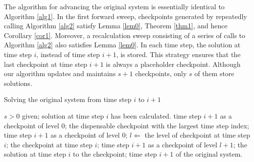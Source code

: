 \documentclass[oneeqnum, onethmnum, onefignum, onetabnum]{siamltex}
\begin{document}
The algorithm for advancing the original system is essentially identical to
Algorithm \ref{alg1}.  In the first forward sweep, checkpoints generated by
repeatedly calling Algorithm \ref{alg2} satisfy Lemma \ref{lem0},
Theorem \ref{thm1}, and hence Corollary \ref{cor1}.  Moreover, a recalculation
sweep consisting of a series of calls to Algorithm \ref{alg2} also satisfies
Lemma \ref{lem0}.  In each time step, the solution at time step $i$, instead
of time step $i + 1$, is stored.  This strategy ensures that the last
checkpoint at time step $i + 1$ is always a placeholder checkpoint.  Although
our algorithm updates and maintains $s + 1$ checkpoints, only $s$ of
them store solutions.
\begin{algorithm}
\caption{Solving the original system from time step $i$ to $i + 1$}
\label{alg2}
\begin{algorithmic}[indent=3em]
    \REQUIRE $s > 0$ given; solution at time step $i$ has been calculated.
         time step $i + 1$ as a checkpoint of level 0;
         the dispensable checkpoint with the largest time
               step index;
         time step $i + 1$ as a checkpoint of level 0;
    \ELSE
        \STATE $l \Leftarrow$ the level of checkpoint at time step $i$;
         the checkpoint at time step $i$;
         time step $i + 1$ as a checkpoint of level
               $l + 1$;
    \ENDIF
         the solution at time step $i$ to the checkpoint;
    \ENDIF
     time step $i + 1$ of the original system.
\end{algorithmic}
\end{algorithm}
\end{document}
